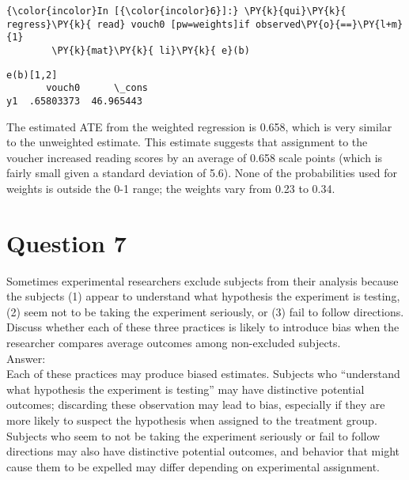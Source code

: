 \documentclass[11pt,notitlepage]{article}\usepackage[]{graphicx}\usepackage[]{color}
\makeatletter
\newenvironment{kframe}{%
 \def\at@end@of@kframe{}%
 \ifinner\ifhmode%
  \def\at@end@of@kframe{\end{minipage}}%
  \begin{minipage}{\columnwidth}%
 \fi\fi%
 \def\FrameCommand##1{\hskip\@totalleftmargin \hskip-\fboxsep
 \colorbox{shadecolor}{##1}\hskip-\fboxsep
     \hskip-\linewidth \hskip-\@totalleftmargin \hskip\columnwidth}%
 \MakeFramed {\advance\hsize-\width
   \@totalleftmargin\z@ \linewidth\hsize
   \@setminipage}}%
 {\par\unskip\endMakeFramed%
 \at@end@of@kframe}
\newenvironment{knitrout}{}{} %
\makeatother
\begin{document}
\begin{knitrout}
\begin{kframe}
    \begin{Verbatim}[commandchars=\\\{\}]
{\color{incolor}In [{\color{incolor}6}]:} \PY{k}{qui}\PY{k}{ regress}\PY{k}{ read} vouch0 [pw=weights]if observed\PY{o}{==}\PY{l+m}{1}
        \PY{k}{mat}\PY{k}{ li}\PY{k}{ e}(b)
\end{Verbatim}

    \begin{Verbatim}[commandchars=\\\{\}]
e(b)[1,2]
       vouch0      \_cons
y1  .65803373  46.965443

    \end{Verbatim}
\end{kframe}
\end{knitrout}

The estimated ATE from the weighted regression is 0.658, which is very similar to the unweighted estimate. This estimate suggests that assignment to the voucher increased reading scores by an average of 0.658 scale points (which is fairly small given a standard deviation of 5.6). None of the probabilities used for weights is outside the 0-1 range; the weights vary from 0.23 to 0.34.

\section*{Question 7}
Sometimes experimental researchers exclude subjects from their analysis because the subjects (1) appear to understand what hypothesis the experiment is testing, (2) seem not to be taking the experiment seriously, or (3) fail to follow directions. Discuss whether each of these three practices is likely to introduce bias when the researcher compares average outcomes among non-excluded subjects.\\
Answer:\\
Each of these practices may produce biased estimates. Subjects who ``understand what hypothesis the experiment is testing'' may have distinctive potential outcomes; discarding these observation may lead to bias, especially if they are more likely to suspect the hypothesis when assigned to the treatment group. Subjects who seem to not be taking the experiment seriously or fail to follow directions may also have distinctive potential outcomes, and behavior that might cause them to be expelled may differ depending on experimental assignment.
\end{document}
